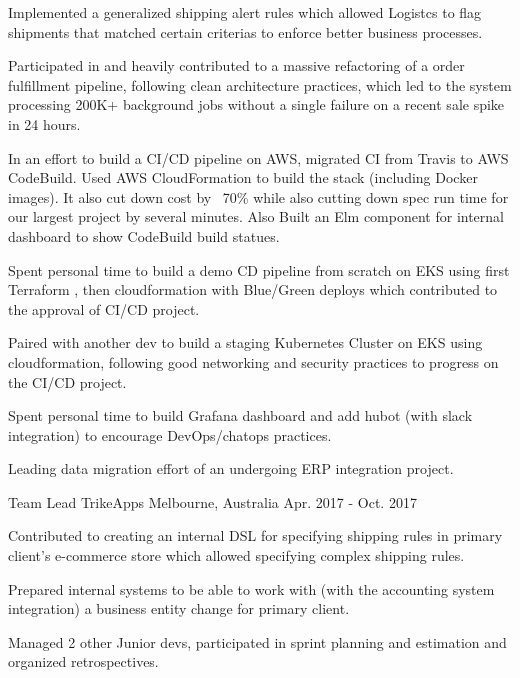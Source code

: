 \begin{cventries}
{\begin{cvitems}
        \item {Implemented a generalized shipping alert rules which allowed Logistcs to flag shipments that matched certain criterias to enforce better business processes.}
        \item {Participated in and heavily contributed to a massive refactoring of a order fulfillment pipeline, following clean architecture practices, which led to the system processing 200K+ background jobs without a single failure on a recent sale spike in 24 hours.}
        \item {In an effort to build a CI/CD pipeline on AWS, migrated CI from Travis to AWS CodeBuild. Used AWS CloudFormation to build the stack (including Docker images). It also cut down cost by ~70\% while also cutting down spec run time for our largest project by several minutes. Also Built an Elm component for internal dashboard to show CodeBuild build statues.}
        \item {Spent personal time to build a demo CD pipeline from scratch on EKS using first Terraform , then cloudformation with Blue/Green deploys which contributed to the approval of CI/CD project.}
        \item {Paired with another dev to build a staging Kubernetes Cluster on EKS using cloudformation, following good networking and security practices to progress on the CI/CD project.}
        \item {Spent personal time to build Grafana dashboard and add hubot (with slack integration) to encourage DevOps/chatops practices.}
        \item {Leading data migration effort of an undergoing ERP integration project.}
      \end{cvitems}
    }
  \cventry
    {Team Lead} %
    {TrikeApps} %
    {Melbourne, Australia} %
    {Apr. 2017 - Oct. 2017} %
    {
      \begin{cvitems} %
        \item {Contributed to creating an internal DSL for specifying shipping rules in primary client's e-commerce store which allowed specifying complex shipping rules.}
        \item {Prepared internal systems to be able to work with (with the accounting system integration) a business entity change for primary client.}
        \item {Managed 2 other Junior devs, participated in sprint planning and estimation and organized retrospectives.}

\end{cvitems}}
\end{cventries}
